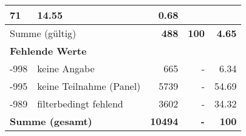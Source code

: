 \begin{longtable}{lXrrr}
       \num{71} &
       \num[round-mode=places,round-precision=2]{14,55} &
         \num[round-mode=places,round-precision=2]{0,68} \\
     \midrule
     \multicolumn{2}{l}{Summe (gültig)} &
       \textbf{\num{488}} &
     \textbf{100} &
       \textbf{\num[round-mode=places,round-precision=2]{4,65}} \\
     \multicolumn{5}{l}{\textbf{Fehlende Werte}}\\
       -998 &
       keine Angabe &
         \num{665} &
        - &
         \num[round-mode=places,round-precision=2]{6,34} \\
       -995 &
       keine Teilnahme (Panel) &
         \num{5739} &
        - &
         \num[round-mode=places,round-precision=2]{54,69} \\
       -989 &
       filterbedingt fehlend &
         \num{3602} &
        - &
         \num[round-mode=places,round-precision=2]{34,32} \\
     \midrule
     \multicolumn{2}{l}{\textbf{Summe (gesamt)}} &
          \textbf{\num{10494}} &
        \textbf{-} &
        \textbf{100} \\
     \bottomrule
     \end{longtable}
     
